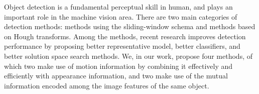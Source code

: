 \begin{eabstract}
Object detection is a fundamental perceptual skill in human, and plays an important role in the machine vision area. There are two main categories of detection methods: methods using the sliding-window schema and methods based on Hough transforms. Among the methods, recent research improves detection performance by proposing better representative model, better classifiers, and better solution space search methods. We, in our work, propose four methods, of which two make use of motion information by combining it effectively and efficiently with appearance information, and two make use of the mutual information encoded among the image features of the same object.
\end{eabstract}